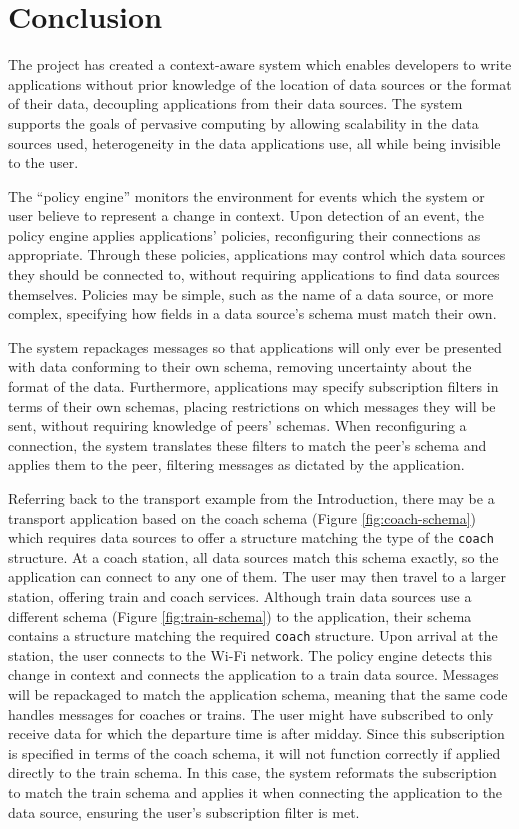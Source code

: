 \documentclass[12pt,twoside,notitlepage]{report}
\begin{document}
\cleardoublepage

\chapter{Conclusion}

The project has created a context-aware system which enables developers to write applications without prior knowledge of the location of data sources or the format of their data, decoupling applications from their data sources. 
The system supports the goals of pervasive computing by allowing scalability in the data sources used, heterogeneity in the data applications use, all while being invisible to the user.

The ``policy engine'' monitors the environment for events which the system or user believe to represent a change in context.
Upon detection of an event, the policy engine applies applications' policies, reconfiguring their connections as appropriate. 
Through these policies, applications may control which data sources they should be connected to, without requiring applications to find data sources themselves.
Policies may be simple, such as the name of a data source, or more complex, specifying how fields in a data source's schema must match their own. 

The system repackages messages so that applications will only ever be presented with data conforming to their own schema, removing uncertainty about the format of the data.
Furthermore, applications may specify subscription filters in terms of their own schemas, placing restrictions on which messages they will be sent, without requiring knowledge of peers' schemas.
When reconfiguring a connection, the system translates these filters to match the peer's schema and applies them to the peer, filtering messages as dictated by the application.

Referring back to the transport example from the Introduction, there may be a transport application based on the coach schema (Figure \ref{fig:coach-schema}) which requires data sources to offer a structure matching the type of the {\tt coach} structure. 
At a coach station, all data sources match this schema exactly, so the application can connect to any one of them. 
The user may then travel to a larger station, offering train and coach services. 
Although train data sources use a different schema (Figure \ref{fig:train-schema}) to the application, their schema contains a structure matching the required {\tt coach} structure.
Upon arrival at the station, the user connects to the Wi-Fi network. The policy engine detects this change in context and connects the application to a train data source. 
Messages will be repackaged to match the application schema, meaning that the same code handles messages for coaches or trains.
The user might have subscribed to only receive data for which the departure time is after midday. 
Since this subscription is specified in terms of the coach schema, it will not function correctly if applied directly to the train schema. 
In this case, the system reformats the subscription to match the train schema and applies it when connecting the application to the data source, ensuring the user's subscription filter is met.
\end{document}
